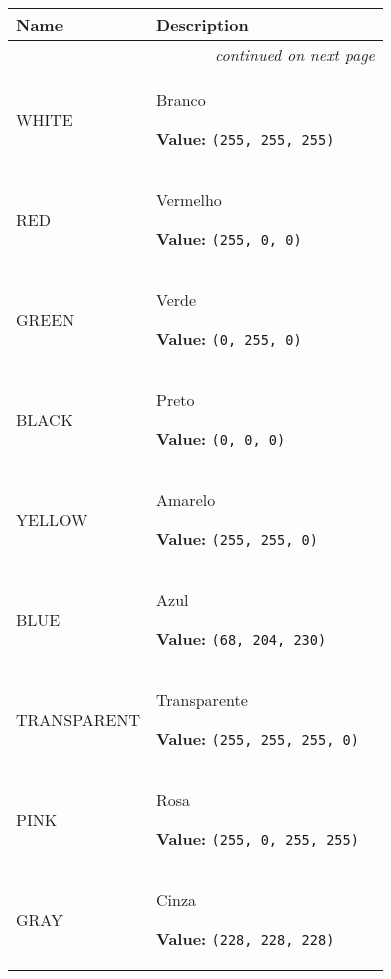     \vspace{-1cm}
\hspace{\varindent}\begin{longtable}{|p{\varnamewidth}|p{\vardescrwidth}|l}
\cline{1-2}
\cline{1-2} \centering \textbf{Name} & \centering \textbf{Description}& \\
\cline{1-2}
\endhead\cline{1-2}\multicolumn{3}{r}{\small\textit{continued on next page}}\\\endfoot\cline{1-2}
\endlastfoot\raggedright W\-H\-I\-T\-E\- & \raggedright Branco

\textbf{Value:} 
{\tt \texttt{(}255\texttt{, }255\texttt{, }255\texttt{)}}&\\
\cline{1-2}
\raggedright R\-E\-D\- & \raggedright Vermelho

\textbf{Value:} 
{\tt \texttt{(}255\texttt{, }0\texttt{, }0\texttt{)}}&\\
\cline{1-2}
\raggedright G\-R\-E\-E\-N\- & \raggedright Verde

\textbf{Value:} 
{\tt \texttt{(}0\texttt{, }255\texttt{, }0\texttt{)}}&\\
\cline{1-2}
\raggedright B\-L\-A\-C\-K\- & \raggedright Preto

\textbf{Value:} 
{\tt \texttt{(}0\texttt{, }0\texttt{, }0\texttt{)}}&\\
\cline{1-2}
\raggedright Y\-E\-L\-L\-O\-W\- & \raggedright Amarelo

\textbf{Value:} 
{\tt \texttt{(}255\texttt{, }255\texttt{, }0\texttt{)}}&\\
\cline{1-2}
\raggedright B\-L\-U\-E\- & \raggedright Azul

\textbf{Value:} 
{\tt \texttt{(}68\texttt{, }204\texttt{, }230\texttt{)}}&\\
\cline{1-2}
\raggedright T\-R\-A\-N\-S\-P\-A\-R\-E\-N\-T\- & \raggedright Transparente

\textbf{Value:} 
{\tt \texttt{(}255\texttt{, }255\texttt{, }255\texttt{, }0\texttt{)}}&\\
\cline{1-2}
\raggedright P\-I\-N\-K\- & \raggedright Rosa

\textbf{Value:} 
{\tt \texttt{(}255\texttt{, }0\texttt{, }255\texttt{, }255\texttt{)}}&\\
\cline{1-2}
\raggedright G\-R\-A\-Y\- & \raggedright Cinza

\textbf{Value:} 
{\tt \texttt{(}228\texttt{, }228\texttt{, }228\texttt{)}}&\\
\cline{1-2}
\end{longtable}

